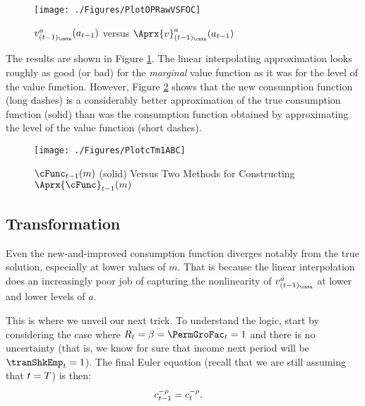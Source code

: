 \documentclass[SolvingMicroDSOPs]{subfiles}
\begin{document}
\hypertarget{PlotOPRawVSFOC}{}
\begin{figure}
  \centerline{\texttt{[image: ./Figures/PlotOPRawVSFOC]}}
  \caption{$\vFunc_{(\prdT-1)_\cntn}^{a}(a_{\prdT-1})$ versus $\Aprx{\vFunc}_{(\prdT-1)_\cntn}^{a}(a_{\prdT-1})$}
  \label{fig:PlotOPRawVSFOC}
\end{figure}


The results are shown in Figure \ref{fig:PlotOPRawVSFOC}.  The linear interpolating approximation looks roughly as good (or bad) for the \textit{marginal} value function as it was for the level of the value function. However, Figure \ref{fig:PlotcTm1ABC} shows that the new consumption function (long dashes) is a considerably better approximation of the true consumption function (solid) than was the consumption function obtained by approximating the level of the value function (short dashes).

\hypertarget{PlotcTm1ABC}{}
\begin{figure}
  \centerline{\texttt{[image: ./Figures/PlotcTm1ABC]}}
  \caption{$\cFunc_{\prdT-1}(\mNrm)$ (solid) Versus Two Methods for Constructing $\Aprx{\cFunc}_{\prdT-1}(\mNrm)$}
  \label{fig:PlotcTm1ABC}
\end{figure}

\hypertarget{transformation}{}
\subsection{Transformation}\label{subsec:transformation}

Even the new-and-improved consumption function diverges notably from the true solution, especially at lower values of $m$.  That is because the linear interpolation does an increasingly poor job of capturing the nonlinearity of $\vFunc_{(\prdT-1)_\cntn}^{a}$ at lower and lower levels of $a$.

This is where we unveil our next trick.  To understand the logic, start by considering the case where $\RNrm_{\prdT} = \DiscFac = \PermGroFac_{\prdT} = 1$ and there is no uncertainty (that is, we know for sure that income next period will be $\tranShkEmp_{\prdT} = 1$).  The final Euler equation (recall that we are still assuming that $t=T$) is then:
\begin{equation}\begin{gathered}\begin{aligned}
      c_{t-1}^{-\rho}  & = c_{t}^{-\rho}.
    \end{aligned}\end{gathered}\end{equation}
\end{document}
